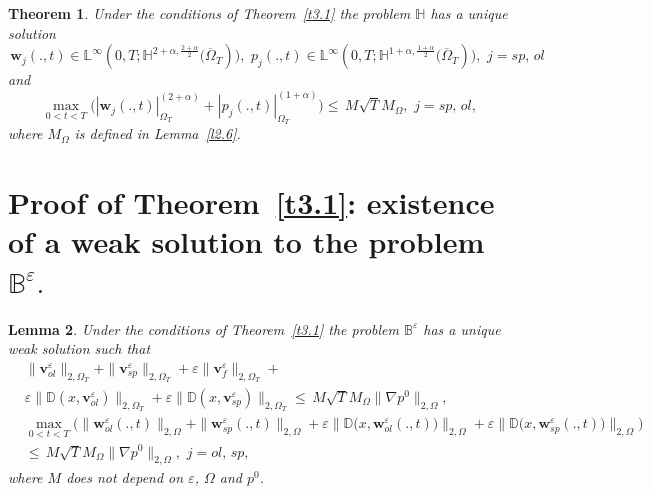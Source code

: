 \documentclass{article}
\theoremstyle{plain}
\newtheorem{theorem}{Theorem}[section]
\newtheorem{lemma}[theorem]{Lemma}
\theoremstyle{definition}
\numberwithin{equation}{section}
\begin{document}
\begin{theorem}\label{t3.2}
Under the conditions of Theorem~\ref{t3.1} the problem $\mathbb{H}$ has a unique solution
\begin{equation*}
\displaystyle\,\boldsymbol{w}_{j}(.,t)\in\mathbb{L}^{\infty}(0,T;\mathbb{H}^{2+\alpha,\frac{2+\alpha}{2}}
\big(\overline{\Omega}_{T})\big),\,\,{p}_{j}(.,t)\in\mathbb{L}^{\infty}(0,T;
\mathbb{H}^{1+\alpha,\frac{1+\alpha}{2}}\big(\overline{\Omega}_{T})\big),\,\,j=sp,\,ol
\end{equation*}
and
\begin{equation}\label{eq3.2}
\max_{0<t<T}\big(|\boldsymbol{w}_{j}(.,t)|^{(2+\alpha)}_{\Omega_{T}}+
|{p}_{j}(.,t)|^{(1+\alpha)}_{\Omega_{T}}\big)\leqslant\,M\sqrt{T}M_{\Omega},\,\,j=sp,\,ol,
\end{equation}
where $M_{\Omega}$ is defined in Lemma~\ref{l2.6}.
\end{theorem}

\section{Proof of Theorem~\ref{t3.1}: existence of a weak solution to the problem $\mathbb{B}^{\varepsilon}.$}
\label{sec4}

\begin{lemma}\label{l4.1}
Under the conditions of Theorem~\ref{t3.1} the problem $\mathbb{B}^{\varepsilon}$ has a unique
weak solution such that
\begin{equation}\label{eq4.1}
\begin{aligned}
& 
\|\boldsymbol{v}^{\varepsilon}_{ol}\|_{2,\Omega_{T}}+\|\boldsymbol{v}^{\varepsilon}_{sp}\|_{2,\Omega_{T}}+
\varepsilon\|\boldsymbol{v}^{\varepsilon}_{f}\|_{2,\Omega_{T}}+
\\
& \varepsilon\|\mathbb{D}(x,\boldsymbol{v}^{\varepsilon}_{ol})\|_{2,\Omega_{T}}+
\varepsilon\|\mathbb{D}(x,\boldsymbol{v}^{\varepsilon}_{sp})\|_{2,\Omega_{T}}
\leqslant\,{M}\sqrt{T}{M}_{\Omega}\|\nabla{p}^{0}\|_{2,\Omega},
\\
& \max_{0<t<T}\Big(\|\boldsymbol{w}^{\varepsilon}_{ol}(.,t)\|_{2,\Omega}+
\|\boldsymbol{w}^{\varepsilon}_{sp}(.,t)\|_{2,\Omega}+
\varepsilon\|\mathbb{D}\big(x,\boldsymbol{w}^{\varepsilon}_{ol}(.,t)\big)\|_{2,\Omega}+
\varepsilon\|\mathbb{D}\big(x,\boldsymbol{w}^{\varepsilon}_{sp}(.,t)\big)\|_{2,\Omega}\Big) 
\\
& \leqslant\,{M}\sqrt{T}{M}_{\Omega}\|\nabla{p}^{0}\|_{2,\Omega},\,\,j=ol,\,sp,
\end{aligned}
\end{equation}
where $M$ does not depend on $\varepsilon$, $\Omega$ and ${p}^{0}$.
\end{lemma}
\end{document}
